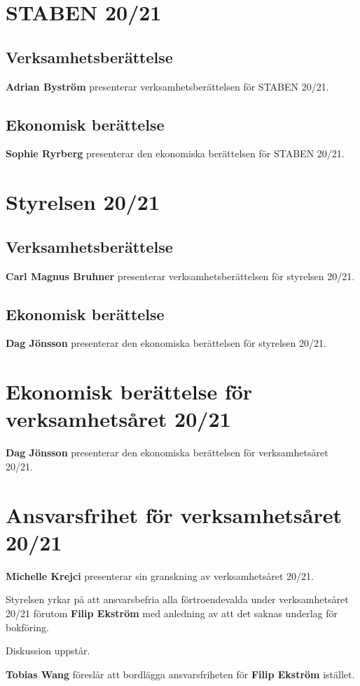 \documentclass{datateknologsektionen-document}
\begin{document}
\section{STABEN 20/21}
\subsection{Verksamhetsberättelse}
\textbf{Adrian Byström} presenterar verksamhetsberättelsen för STABEN 20/21.
\subsection{Ekonomisk berättelse}
\textbf{Sophie Ryrberg} presenterar den ekonomiska berättelsen för STABEN 20/21.

\section{Styrelsen 20/21}
\subsection{Verksamhetsberättelse}
\textbf{Carl Magnus Bruhner} presenterar verksamhetsberättelsen för styrelsen 20/21.
\subsection{Ekonomisk berättelse}
\textbf{Dag Jönsson} presenterar den ekonomiska berättelsen för styrelsen 20/21.

\section{Ekonomisk berättelse för verksamhetsåret 20/21}
\textbf{Dag Jönsson} presenterar den ekonomiska berättelsen för verksamhetsåret 20/21.

\section{Ansvarsfrihet för verksamhetsåret 20/21}
\textbf{Michelle Krejci} presenterar sin granskning av verksamhetsåret 20/21.

Styrelsen yrkar på att ansvarsbefria alla förtroendevalda under verksamhetsåret 20/21 förutom \textbf{Filip Ekström} med anledning av att det saknas underlag för bokföring.

Diskussion uppstår.

\textbf{Tobias Wang} föreslår att bordlägga ansvarsfriheten för \textbf{Filip Ekström} istället.
\end{document}

